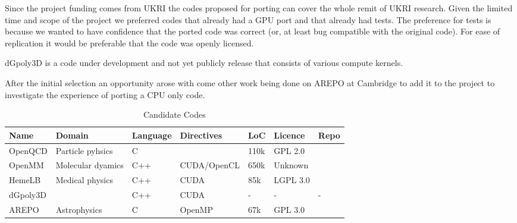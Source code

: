 
Since the project funding comes from UKRI the codes proposed for porting can cover the whole remit of UKRI research.
Given the limited time and scope of the project we preferred codes that already had a GPU port and that already had tests.
The preference for tests is because we wanted to have confidence that the ported code was correct (or, at least bug compatible with the original code).
For ease of replication it would be preferable that the code was openly licensed.

dGpoly3D is a code under development and not yet publicly release that consists of various compute kernels.

After the initial selection an opportunity arose with come other work being done on AREPO at Cambridge to add it to the project to investigate the experience of porting a CPU only code.

\begin{table}[htb]\small
	\centering
	\begin{tabular}{lllllll}
		Name     & Domain            & Language & Directives  & LoC  & Licence  & Repo                                                \\
		\hline
		OpenQCD  & Particle pyhsics  & C        &             & 110k & GPL 2.0  & \cite{fastsum_collaboration_openqcd-fastsum_nodate} \\
		OpenMM   & Molecular dyamics & C++      & CUDA/OpenCL & 650k & Unknown  & \cite{noauthor_openmm_nodate}                       \\
		HemeLB   & Medical physics   & C++      & CUDA        & 85k  & LGPL 3.0 & \cite{hemelb_authors_hemelb_nodate}                 \\
		dGpoly3D &                   & C++      & CUDA        & -    & -        & -                                                   \\
		AREPO    & Astrophysics      & C        & OpenMP      & 67k  & GPL 3.0  & \cite{weinberger_arepo_2020}
	\end{tabular}
	\caption{Candidate Codes}
	\label{tab:candidate codes}
\end{table}
